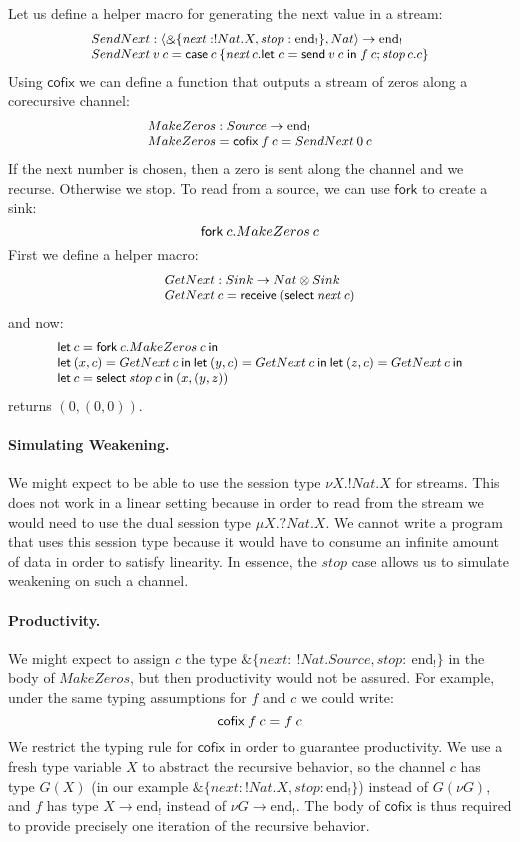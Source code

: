 \documentclass[orivec,envcountsame]{llncs}
\makeatletter
\newcommand{\with}{\mathbin\binampersand}
\newcommand{\uto}{\ensuremath{\rightarrow}}
\newcommand{\outterm}{\mathrm{end}_!}
\newcommand{\mkwd}[1]{\mathsf{#1}}
\newcommand{\clabel}[1]{\mathit{#1}}
\newcommand{\gvsend}[2]{\mkwd{send}\:#1\:#2}
\newcommand{\gvreceive}[1]{\mkwd{receive}\:#1}
\newcommand{\gvlet}[3]{\mkwd{let}\;#1 = #2\;\mkwd{in}\;#3}
\newcommand{\gvselect}[2]{\mkwd{select}\:#1\:#2}
\newcommand{\gvcase}[2]{\mkwd{case}\:#1\:\{#2\}}
\newcommand{\gvfork}[2]{\mkwd{fork}\:#1.#2}
\newcommand{\lrkwd}{\mkwd{cofix}}
\newcommand{\key}{\mkwd}
\newcommand{\cofix}{\lrkwd}
\newcommand{\ba}{\begin{array}}
\newcommand{\ea}{\end{array}}
\newcommand{\bl}{\ba[t]{@{}l@{}}}
\newcommand{\el}{\ea}
\makeatother
\begin{document}
Let us define a helper macro for generating the next value in a stream:
\[\small
\bl
SendNext : \langle \with \{\clabel{next}: !Nat.X, \clabel{stop}: \outterm \}, Nat \rangle \uto \outterm \\
SendNext\:v\:c = \gvcase{c}{\clabel{next}\,c.\gvlet{c}{\gvsend{v}{c}}{f\:c};
                            \clabel{stop}\,c.c}
\el
\]
%
Using $\cofix$ we can define a function that outputs a stream of zeros along a corecursive
channel:
\[\small
  \bl
  MakeZeros : Source \uto \outterm \\
  MakeZeros = \cofix\:f\:c = SendNext\:0\:c
  \el
\]
If the next number is chosen, then a zero is sent along the channel and we recurse. Otherwise we
stop.
%
To read from a source, we can use $\key{fork}$ to create a sink:
\[\small
\gvfork{c}{MakeZeros\:c}
\]
%
First we define a helper macro:
\[\small
\bl
GetNext : Sink \uto Nat \otimes Sink \\
GetNext\:c = \gvreceive{(\gvselect{\clabel{next}}{c})} \\
\el
\]
and now:
\[\small
\bl
\key{let}\:c = \gvfork{c}{MakeZeros\:c}\:\key{in} \\
\key{let}\:(x, c) = GetNext\:c\:\key{in}\:
\key{let}\:(y, c) = GetNext\:c\:\key{in}\:
\key{let}\:(z, c) = GetNext\:c\:\key{in} \\
\key{let}\:c = \gvselect{\clabel{stop}}{c}\:\key{in}\:(x, (y, z)) \\
\el
\]
returns $(0, (0, 0))$.

\paragraph{Simulating Weakening.}
We might expect to be able to use the session type $\nu X.!Nat.X$ for streams. This does not work in
a linear setting because in order to read from the stream we would need to use the dual session type
$\mu X.?Nat.X$. We cannot write a program that uses this session type because it would have to
consume an infinite amount of data in order to satisfy linearity. In essence, the $\clabel{stop}$
case allows us to simulate weakening on such a channel.

\paragraph{Productivity.}
We might expect to assign $c$ the type $\with \{\clabel{next}:\:!Nat.Source, \clabel{stop}:\:\outterm
\}$ in the body of $MakeZeros$, but then productivity would not be assured. For example, under the
same typing assumptions for $f$ and $c$ we could write:
\[\small
\cofix\:f\:c = f\:c
\]
%
We restrict the typing rule for $\cofix$ in order to guarantee productivity. We use a fresh type
variable $X$ to abstract the recursive behavior, so the channel $c$ has type $G(X)$ (in our example
$\with \{\clabel{next}: !Nat.X, \clabel{stop}: \outterm \}$) instead of $G(\nu G)$, and $f$ has type
$X \uto \outterm$ instead of $\nu G \uto \outterm$. The body of $\cofix$ is thus required to provide
precisely one iteration of the recursive behavior.
\end{document}
